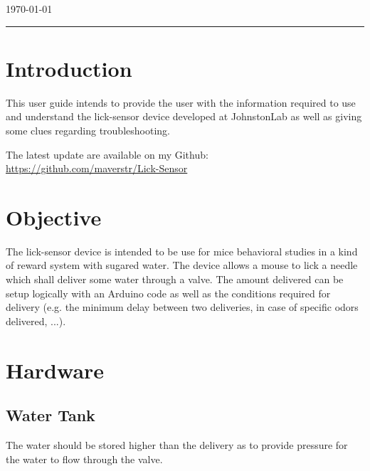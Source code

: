 \documentclass[a4paper]{article}
\begin{document}
\begin{titlepage}

{\large \today}\\[2cm] %


\vfill %

\end{titlepage}


\noindent\rule{\textwidth}{1pt}

\tableofcontents

\newpage

\listoffigures

\newpage



\section{Introduction}
This user guide intends to provide the user with the information required to use and understand the lick-sensor device developed at JohnstonLab as well as giving some clues regarding troubleshooting.

The latest update are available on my Github: \url{https://github.com/maverstr/Lick-Sensor}

\section{Objective}
The lick-sensor device is intended to be use for mice behavioral studies in a kind of reward system with sugared water. The device allows a mouse to lick a needle which shall deliver some water through a valve. The amount delivered can be setup logically with an Arduino code as well as the conditions required for delivery (e.g. the minimum delay between two deliveries, in case of specific odors delivered, ...). 

\section{Hardware}
\subsection{Water Tank}
The water should be stored higher than the delivery as to provide pressure for the water to flow through the valve.
\end{document}
